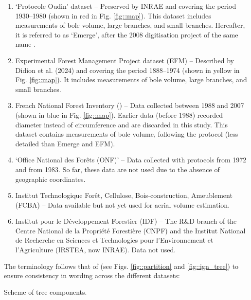 \begin{enumerate}
	\item `Protocole Oudin' dataset -- Preserved by INRAE and covering the period 1930--1980 (shown in red in Fig. \ref{fig::map}). This dataset includes measurements of bole volume, large branches, and small branches. Hereafter, it is referred to as `Emerge', after the 2008 digitisation project of the same name \parencite{Deleuze2013}.
	\item Experimental Forest Management Project dataset (EFM) -- Described by Didion et al. (2024) and covering the period 1888--1974 (shown in yellow in Fig. \ref{fig::map}). It includes measurements of bole volume, large branches, and small branches.
	\item French National Forest Inventory (\NFI) -- Data collected between 1988 and 2007 (shown in blue in Fig. \ref{fig::map}). Earlier data (before 1988) recorded diameter instead of circumference and are discarded in this study. This dataset contains measurements of bole volume, following the \NFI{} protocol (less detailed than Emerge and EFM).
	\item `Office National des Forêts (ONF)' -- Data collected with protocols from 1972 and from 1983. So far, these data are not used due to the absence of geographic coordinates.
	\item Institut Technologique Forêt, Cellulose, Bois-construction, Ameublement (FCBA) -- Data available but not yet used for aerial volume estimation.
	\item Institut pour le Développement Forestier (IDF) -- The R\&D branch of the Centre National de la Propriété Forestière (CNPF) and the Institut National de Recherche en Sciences et Technologies pour l'Environnement et l'Agriculture (IRSTEA, now INRAE). Data not used.
\end{enumerate}

The terminology follows that of \cite{Gschwantner2009} (see Figs. \ref{fig::partition} and \ref{fig::ign_tree}) to ensure consistency in wording across the different datasets:

\begin{marginfigure}%
	
	\caption{Scheme of tree components.\label{fig::ign_tree}}
\end{marginfigure}

